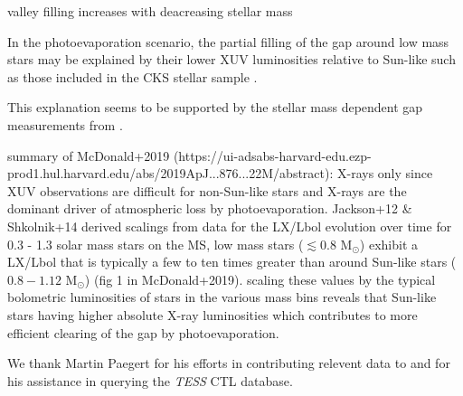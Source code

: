 \documentclass[twocolumn]{emulateapj}
\newcommand{\tess}[1]{\emph{TESS}#1}
\begin{document}
valley filling increases with deacreasing stellar mass  

In the photoevaporation scenario, the
partial filling of the gap around low mass stars may be explained by their lower XUV luminosities relative to 
Sun-like such as those included in the CKS stellar sample \citep{}.

This explanation seems to be supported by the stellar mass dependent gap measurements from \cite{fulton18}. 

summary of McDonald+2019 (https://ui-adsabs-harvard-edu.ezp-prod1.hul.harvard.edu/abs/2019ApJ...876...22M/abstract):
X-rays only since XUV observations are difficult for non-Sun-like stars and X-rays are the dominant driver of 
atmospheric loss by photoevaporation. 
Jackson+12 \& Shkolnik+14 derived scalings from data for the LX/Lbol evolution over time for 0.3 - 1.3 solar mass stars
on the MS, low mass stars ($\lesssim 0.8$ M$_{\odot}$) exhibit a LX/Lbol that is typically a few to ten times greater 
than around Sun-like stars ($0.8-1.12$ M$_{\odot}$) (fig 1 in McDonald+2019).
scaling these values by the typical bolometric luminosities of stars in the various mass bins reveals that 
Sun-like stars having higher absolute X-ray luminosities which contributes to more efficient clearing of the 
gap by photoevaporation.

\acknowledgements
We thank Martin Paegert for his efforts in contributing relevent data to and for his assistance in querying the \tess{}
CTL database.




\end{document}
